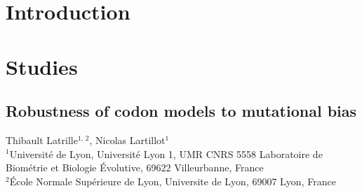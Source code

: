 \documentclass[a4paper,oneside,nobind]{thesis}
\begin{document}
\hypersetup{pageanchor=true}
\begin{romanpages}

\setlength{\baselineskip}{1.4\frontmatterbaselineskip}
\begin{alwayssingle}
	
\end{alwayssingle}

\setlength{\baselineskip}{\frontmatterbaselineskip}
\dominitoc %
\flushbottom
{
	\setlength{\baselineskip}{\frontmatterbaselineskip}
	\hypersetup{linkcolor=GREYDARK}
	\tableofcontents
	\listoffigures
	\mtcaddchapter
	\listoftables
	\mtcaddchapter
}
{
	\setlength{\baselineskip}{\frontmatterbaselineskip}
	
}

\end{romanpages}

\setlength{\baselineskip}{1.4\frontmatterbaselineskip}
\flushbottom


\pagestyle{fancybook}

\part{Introduction}

\label{part:intro}







\part{Studies}
\label{part:studies}

\thispagestyle{empty}
\chapter[Robustness of codon models to mutational bias]{Robustness of codon models to mutational bias}
\label{chap:NucleotideBias}

\begin{center}
	\Large Thibault Latrille$^{\text{1, 2}}$, Nicolas Lartillot$^{\text{1}}$\\
	\vspace{0.5cm}
	\normalsize
	$^{\text{1}}$Université de Lyon, Université Lyon 1, UMR CNRS 5558 Laboratoire de Biométrie et Biologie Évolutive, 69622 Villeurbanne, France\\
	$^{\text{2}}$École Normale Supérieure de Lyon, Universite de Lyon, 69007 Lyon, France\\
\end{center}
\end{document}
